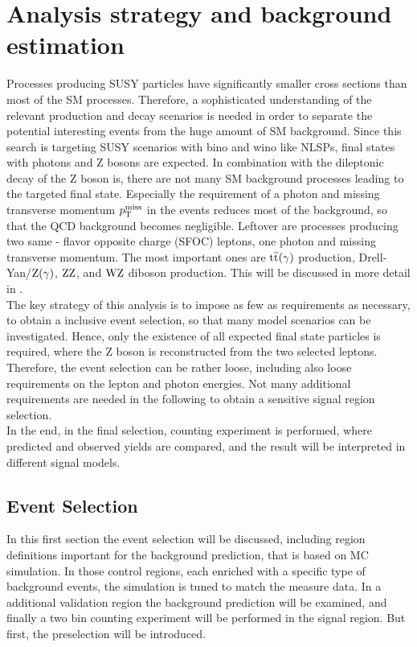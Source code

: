\chapter{Analysis strategy and background estimation}\label{chap:analysis}

Processes producing SUSY particles have significantly smaller cross sections than most of the SM processes. Therefore, a sophisticated understanding of the relevant production and decay scenarios is needed in order to separate the potential interesting events from the huge amount of SM background. Since this search is targeting SUSY scenarios with bino and wino like NLSPs, final states with photons and Z bosons are expected. In combination with the dileptonic decay of the Z boson is, there are not many SM background processes leading to the targeted final state. Especially the requirement of a photon and missing transverse momentum $p_{\mathrm{T}}^\text{miss}$ in the events reduces most of the background, so that \eg the QCD background becomes negligible. Leftover are processes producing two same - flavor opposite charge (SFOC) leptons, one photon and missing transverse momentum. The most important ones are ${\mathrm{t}\overline{\mathrm{t}}}(\gamma)$ production, Drell-Yan/$\mathrm{Z}(\gamma)$, $\mathrm{Z}\mathrm{Z}$, and $\mathrm{W}\mathrm{Z}$ diboson production. This will be discussed in more detail in .\\
The key strategy of this analysis is to impose as few as requirements as necessary, to obtain a inclusive event selection, so that many model scenarios can be investigated. Hence, only the existence of all expected final state particles is required, where the Z boson is reconstructed from the two selected leptons. Therefore, the event selection can be rather loose, including also loose requirements on the lepton and photon energies. Not many additional requirements are needed in the following to obtain a sensitive signal region selection.\\
In the end, in the final selection, counting experiment is performed, where predicted and observed yields are compared, and the result will be interpreted in different signal models.

\section{Event Selection}
In this first section the event selection will be discussed, including region definitions important for the background prediction, that is based on MC simulation. In those control regions, each enriched with a specific type of background events, the simulation is tuned to match the measure data. In a additional validation region the background prediction will be examined, and finally a two bin counting experiment will be performed in the signal region. But first, the preselection will be introduced.

